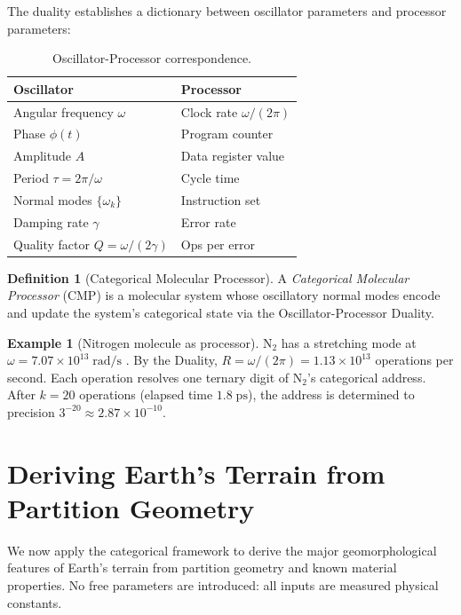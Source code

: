 \documentclass[10pt,twocolumn]{article}
\theoremstyle{definition}
\newtheorem{definition}[theorem]{Definition}
\newtheorem{example}[theorem]{Example}
\theoremstyle{remark}
\begin{document}
The duality establishes a dictionary between oscillator
parameters and processor parameters:

\begin{table}[H]
\centering
\caption{Oscillator-Processor correspondence.}
\label{tab:dictionary}
\begin{tabular}{@{}ll@{}}
\toprule
\textbf{Oscillator} & \textbf{Processor} \\
\midrule
Angular frequency $\omega$ & Clock rate $\omega/(2\pi)$ \\
Phase $\phi(t)$ & Program counter \\
Amplitude $A$ & Data register value \\
Period $\tau=2\pi/\omega$ & Cycle time \\
Normal modes $\{\omega_k\}$ & Instruction set \\
Damping rate $\gamma$ & Error rate \\
Quality factor $Q=\omega/(2\gamma)$ & Ops per error \\
\bottomrule
\end{tabular}
\end{table}

\begin{definition}[Categorical Molecular Processor]
\label{def:CMP}
A \emph{Categorical Molecular Processor} (CMP) is a molecular
system whose oscillatory normal modes encode and update the
system's categorical state via the Oscillator-Processor
Duality.
\end{definition}

\begin{example}[Nitrogen molecule as processor]
N$_2$ has a stretching mode at
$\omega=7.07\times 10^{13}\;\mathrm{rad/s}$
\citep{Herzberg1945}.  By the Duality,
$R=\omega/(2\pi)=1.13\times 10^{13}$ operations per second.
Each operation resolves one ternary digit of N$_2$'s
categorical address.  After $k=20$ operations (elapsed time
$1.8\;\mathrm{ps}$), the address is determined to precision
$3^{-20}\approx 2.87\times 10^{-10}$.
\end{example}

\section{Deriving Earth's Terrain from Partition Geometry}
\label{sec:terrain}

We now apply the categorical framework to derive the major
geomorphological features of Earth's terrain from partition
geometry and known material properties.  No free parameters
are introduced: all inputs are measured physical constants.
\end{document}
